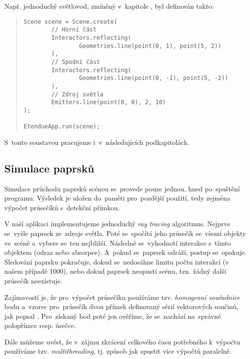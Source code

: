 \beautypage

Např. jednoduchý světlovod, zmíněný v~kapitole , byl definován takto:

\begin{minipage}{\textwidth}\begin{quote}\begin{lstlisting}
Scene scene = Scene.create(
        // Horní část
        Interactors.reflecting(
                Geometries.line(point(0, 1), point(5, 2))
        ),
        // Spodní část
        Interactors.reflecting(
                Geometries.line(point(0, -1), point(5, -2))
        ),
        // Zdroj světla
        Emitters.line(point(0, 0), 2, 10)
);

EtendueApp.run(scene);
\end{lstlisting}\end{quote}\end{minipage}

S~touto soustavou pracujeme i~v~následujících podkapitolách.


\subsection{Simulace paprsků}
\label{sub:architekturaaplikace_simulacepaprsku}

Simulace průchodu paprsků scénou se~provede pouze jednou, hned po~spuštění programu. Výsledek je uložen do~paměti pro~pozdější použití, tedy zejména výpočet průsečíků s~detekční přímkou.

V naší aplikaci implementujeme jednoduchý \emph{ray tracing} algoritmus. Nejprve se~vyšle paprsek ze~zdroje světla. Poté se~spočítá jeho průsečík se~všemi objekty ve~scéně a~vybere se~ten nejbližší. Následně se~vyhodnotí interakce s~tímto objektem (odraz nebo absorpce). A~pokud se~paprsek odráží, postup se~opakuje. Sledování paprsku pokračuje, dokud se~nedosáhne limitu počtu interakcí (v našem případě 1000), nebo dokud paprsek neopustí scénu, tzn. žádný další průsečík neexistuje.

Zajímavostí je, že pro~výpočet průsečíku používáme tzv. \emph{homogenní souřadnice} bodu a~vzorec pro~průsečík dvou přímek definovaný sérií vektorových součinů, jak popsal \textcite{skala2008intersection}. Pro~získaný bod poté jen ověříme, že se~nachází na~správné polopřímce resp. úsečce.

Dále můžeme uvést, že v~zájmu zkrácení celkového času potřebného k~výpočtu používáme tzv. \emph{multithreading}, tj. způsob jak spustit více výpočtů paralelně.

